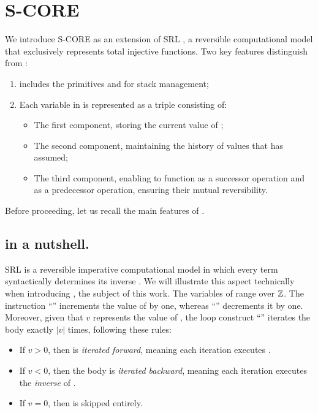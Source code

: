 
\section{\textsf{S-CORE}}
\label{section:S-CORE}
We introduce \textsf{S-CORE} as an extension of \textsf{SRL} \cite{Matos:TCS03}, a reversible computational model that exclusively represents total injective functions. 
Two key features distinguish \SCORE from \SRL:
\begin{enumerate}
    \item \SCORE includes the primitives  and  for stack management;
    \item Each variable  in \SCORE is represented as a triple consisting of:
    \begin{itemize}
        \item The first component, storing the current value of ;
        \item The second component, maintaining the history of values that  has assumed;
        \item The third component, enabling  to function as a successor operation and  as a predecessor operation, ensuring their mutual reversibility.
    \end{itemize}
\end{enumerate}
\noindent
Before proceeding, let us recall the main features of \SRL.

\subsection{\SRL in a nutshell.}
\label{subsection:SRL in a nutshell}
\textsf{SRL} is a reversible imperative computational model 
in which every term  syntactically determines its inverse . We will illustrate this aspect technically when introducing \SCORE, the subject of this work.
The variables of \SRL range over $\mathbb{Z}$. The instruction ``'' increments the value of  by one, whereas ``'' decrements it by one. Moreover,
given that $v$ represents the value of , the loop construct ``'' iterates the body  exactly $|v|$ times, following these rules:
\begin{itemize}
    \item If $v > 0$, then  is \emph{iterated forward}, meaning each iteration executes .
    \item If $v < 0$, then the body is \emph{iterated backward}, meaning each iteration executes the \emph{inverse}  of .
    \item If $v = 0$, then  is skipped entirely.
\end{itemize}



